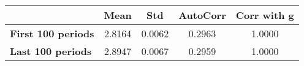 \begin{tiny}\begin{tabular}{|l|c|c|c|c|}
\hline
&\textbf{Mean}&\textbf{Std}&\textbf{AutoCorr}&\textbf{Corr with g}\\\hline
\textbf{First 100 periods}&2.8164&0.0062&0.2963&1.0000\\\hline
\textbf{Last 100 periods}&2.8947&0.0067&0.2959&1.0000\\\hline
\end{tabular}
\end{tiny}
